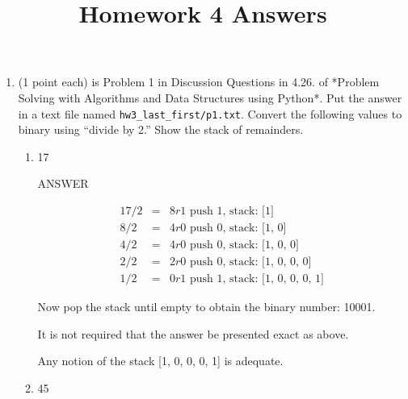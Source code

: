 \documentclass{article} %
\title{Homework 4 Answers}
\author{}
\newenvironment{mpage}
  {\hspace{0.1in}
   \begin{minipage}{4.5in}
     \setlength{\parskip}{.5em}
     \vspace{0.1in}}    
  {\vspace{0.1in}
   \end{minipage}}
\begin{document}
\maketitle

\renewcommand{\labelenumi}{Problem \arabic{enumi}}

\renewcommand{\labelenumii}{\alph{enumii})}


\begin{enumerate}

\item (1 point each) is Problem 1 in Discussion Questions in 4.26.  of
  *Problem Solving with Algorithms and Data Structures using Python*.
  Put the answer in a text file named \verb|hw3_last_first/p1.txt|.
  Convert the following values to binary using “divide by 2.” Show the
  stack of remainders.


  \begin{enumerate}
  \item
      17

      \begin{mpage}
        ANSWER
        
        \begin{eqnarray*}
          17 / 2 &=& 8 r 1 \text{ push 1, stack: [1]} \\
          8 / 2  &=& 4 r 0 \text{ push 0, stack: [1, 0]} \\
          4 / 2  &=& 4 r 0 \text{ push 0, stack: [1, 0, 0]} \\
          2 / 2  &=& 2 r 0 \text{ push 0, stack: [1, 0, 0, 0]} \\
          1 / 2  &=& 0 r 1 \text{ push 1, stack: [1, 0, 0, 0, 1]} 
        \end{eqnarray*}

        Now pop the stack until empty to obtain the binary number: 10001.

        It is not required that the answer be presented exact as above.

        Any notion of the stack [1, 0, 0, 0, 1] is adequate.
        \vspace{.1in}

      \end{mpage}

    
    \item
        45
      

\end{enumerate}
\end{enumerate}
\end{document}
